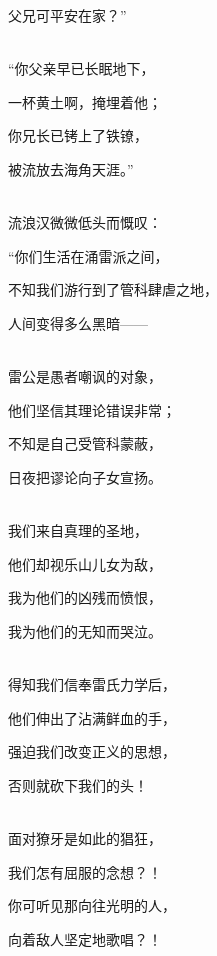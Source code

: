\documentclass[UTF8,12pt,oneside]{ctexbook}
\begin{document}
\begin{center}
        父兄可平安在家？”
        
        ~\\
        
        “你父亲早已长眠地下，
        
        一杯黄土啊，掩埋着他；
        
        你兄长已铐上了铁镣，
        
        被流放去海角天涯。”
       
        ~\\
        
        流浪汉微微低头而慨叹：
        
        “你们生活在涌雷派之间，
        
        不知我们游行到了管科肆虐之地，
        
        人间变得多么黑暗——
       
        ~\\
        
        雷公是愚者嘲讽的对象，
        
        他们坚信其理论错误非常；
        
        不知是自己受管科蒙蔽，
        
        日夜把谬论向子女宣扬。
      
        ~\\
        
        我们来自真理的圣地，
        
        他们却视乐山儿女为敌，
        
        我为他们的凶残而愤恨，
        
        我为他们的无知而哭泣。
      
        ~\\
        
        得知我们信奉雷氏力学后，
        
        他们伸出了沾满鲜血的手，
        
        强迫我们改变正义的思想，
        
        否则就砍下我们的头！
      
        ~\\
        
        面对獠牙是如此的猖狂，
        
        我们怎有屈服的念想？！
        
        你可听见那向往光明的人，
        
        向着敌人坚定地歌唱？！
      
        ~\\
        

\end{center}
\end{document}
